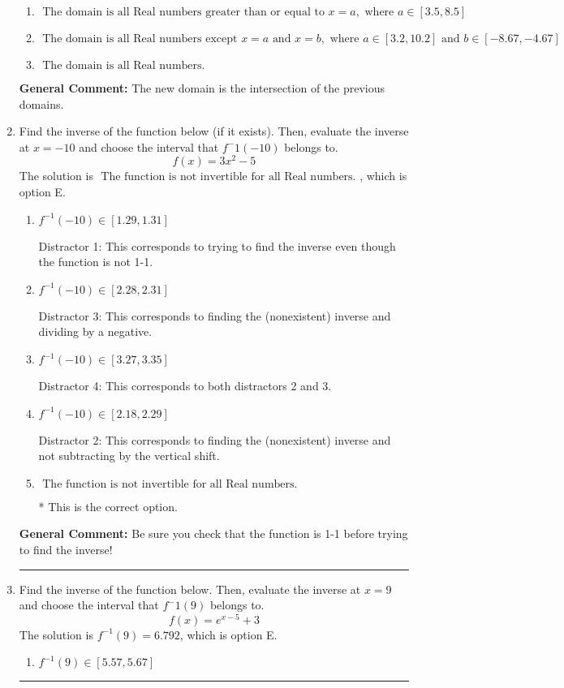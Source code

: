 \documentclass{extbook}[14pt]
\newcommand{\litem}[1]{\item #1

\rule{\textwidth}{0.4pt}}
\begin{document}
\begin{enumerate}
{\begin{enumerate}[label=\Alph*.]
\item \( \text{ The domain is all Real numbers greater than or equal to } x = a, \text{ where } a \in [3.5, 8.5] \)


\item \( \text{ The domain is all Real numbers except } x = a \text{ and } x = b, \text{ where } a \in [3.2, 10.2] \text{ and } b \in [-8.67, -4.67] \)


\item \( \text{ The domain is all Real numbers. } \)


\end{enumerate}

\textbf{General Comment:} The new domain is the intersection of the previous domains.
}
\litem{
Find the inverse of the function below (if it exists). Then, evaluate the inverse at $x = -10$ and choose the interval that $f^-1(-10)$ belongs to.
\[ f(x) = 3 x^2 - 5 \]The solution is \( \text{ The function is not invertible for all Real numbers. } \), which is option E.\begin{enumerate}[label=\Alph*.]
\item \( f^{-1}(-10) \in [1.29, 1.31] \)

 Distractor 1: This corresponds to trying to find the inverse even though the function is not 1-1. 
\item \( f^{-1}(-10) \in [2.28, 2.31] \)

 Distractor 3: This corresponds to finding the (nonexistent) inverse and dividing by a negative.
\item \( f^{-1}(-10) \in [3.27, 3.35] \)

 Distractor 4: This corresponds to both distractors 2 and 3.
\item \( f^{-1}(-10) \in [2.18, 2.29] \)

 Distractor 2: This corresponds to finding the (nonexistent) inverse and not subtracting by the vertical shift.
\item \( \text{ The function is not invertible for all Real numbers. } \)

* This is the correct option.
\end{enumerate}

\textbf{General Comment:} Be sure you check that the function is 1-1 before trying to find the inverse!
}
\litem{
Find the inverse of the function below. Then, evaluate the inverse at $x = 9$ and choose the interval that $f^-1(9)$ belongs to.
\[ f(x) = e^{x-5}+3 \]The solution is \( f^{-1}(9) = 6.792 \), which is option E.\begin{enumerate}[label=\Alph*.]
\item \( f^{-1}(9) \in [5.57, 5.67] \)


\end{enumerate}}
\end{enumerate}
\end{document}
